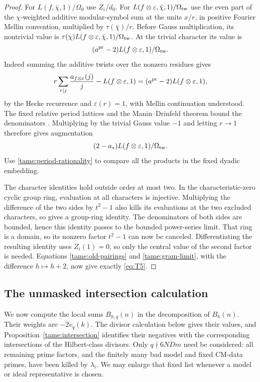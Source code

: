 \begin{proof}
For \(L(f,\bar\chi,1)/\Omega_0\) use \(Z_i/d_0\).
For \(L(f\otimes\varepsilon,\bar\chi,1)/\Omega_{\rm tw}\)
use the even part of the \(\chi\)-weighted additive modular-symbol
sum at the units \(x/r\), in positive Fourier Mellin convention,
multiplied by \(\tau(\bar\chi)/r\).
Before Gauss multiplication, its nontrivial value is
\(\tau(\chi)L(f\otimes\varepsilon,\bar\chi,1)/\Omega_{\rm tw}\).
At the trivial character its value is
\[
 (a^{\rm pr}-2)L(f\otimes\varepsilon,1)/\Omega_{\rm tw}.
 \]
Indeed summing the additive twists over the nonzero residues gives
\[
 r\sum_{r\mid j}\frac{a_{f\otimes\varepsilon}(j)}j
       -L(f\otimes\varepsilon,1)
   =(a^{\rm pr}-2)L(f\otimes\varepsilon,1),
\]
by the Hecke recurrence and \(\varepsilon(r)=1\), with Mellin
continuation understood. The fixed relative period lattices and
the Manin--Drinfeld theorem bound the denominators
\cite{ManinDrinfeld}. Multiplying by the trivial Gauss value
\(-1\) and letting \(r\to1\) therefore gives augmentation
\[
 (2-a_*)L(f\otimes\varepsilon,1)/\Omega_{\rm tw}.
\]
Use \eqref{tame:period-rationality} to compare all the products
in the fixed dyadic embedding.

The character identities hold outside order at most two. In the
characteristic-zero cyclic group ring, evaluation at all characters
is injective. Multiplying the difference of the two sides by
\(t^2-1\) also kills its evaluations at the two excluded characters,
so gives a group-ring identity. The denominators of both sides are
bounded, hence this identity passes to the bounded power-series
limit. That ring is a domain, so its nonzero factor \(t^2-1\)
can now be canceled. Differentiating the
resulting identity uses \(Z_i(1)=0\), so only the central value
of the second factor is needed. Equations
\eqref{tame:old-pairings} and \eqref{tame:gram-limit}, with the
difference \(h\mapsto h+2\), now give exactly \eqref{eq:T5}.
\end{proof}

\subsection{The unmasked intersection calculation}

We now compute the local sums \(B_{h,q}(n)\) in the decomposition
of \(B_h(n)\). Their weights are \(-2v_q(k)\). The divisor calculation
below gives their values, and Proposition~\ref{tame:intersection}
identifies their negatives with the corresponding intersections of
the Hilbert-class divisors. Only \(q\nmid6NDm\) need be considered:
all remaining prime factors,
and the finitely many bad model and fixed CM-data primes, have
been killed by \(\lambda_i\). We may enlarge that fixed list
whenever a model or ideal representative is chosen.


